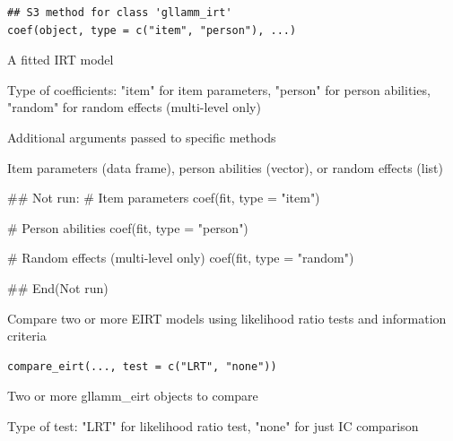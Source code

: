 \documentclass[a4paper]{book}
\begin{document}
%
\begin{Usage}
\begin{verbatim}
## S3 method for class 'gllamm_irt'
coef(object, type = c("item", "person"), ...)
\end{verbatim}
\end{Usage}
%
\begin{Arguments}
\begin{ldescription}
\item[\code{object}] A fitted IRT model

\item[\code{type}] Type of coefficients: "item" for item parameters,
"person" for person abilities, "random" for random effects (multi-level only)

\item[\code{...}] Additional arguments passed to specific methods
\end{ldescription}
\end{Arguments}
%
\begin{Value}
Item parameters (data frame), person abilities (vector),
or random effects (list)
\end{Value}
%
\begin{Examples}
\begin{ExampleCode}
## Not run: 
# Item parameters
coef(fit, type = "item")

# Person abilities
coef(fit, type = "person")

# Random effects (multi-level only)
coef(fit, type = "random")

## End(Not run)

\end{ExampleCode}
\end{Examples}
%
\begin{Description}
Compare two or more EIRT models using likelihood ratio tests and information criteria
\end{Description}
%
\begin{Usage}
\begin{verbatim}
compare_eirt(..., test = c("LRT", "none"))
\end{verbatim}
\end{Usage}
%
\begin{Arguments}
\begin{ldescription}
\item[\code{...}] Two or more gllamm\_eirt objects to compare

\item[\code{test}] Type of test: "LRT" for likelihood ratio test, "none" for just IC comparison
\end{ldescription}
\end{Arguments}
\end{document}
